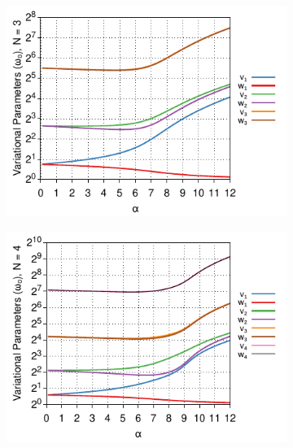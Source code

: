 \begin{figure}[!tbp]
\begin{subfigure}[b]{0.49\textwidth}
    \includegraphics[width=\textwidth]{figures/frohlich-3d-multivariate-vw-alpha-0to12-beta-inf-N-3-COLOUR.pdf}
  \end{subfigure}
  \begin{subfigure}[b]{0.49\textwidth}
    \centering
    \includegraphics[width=\textwidth]{figures/frohlich-3d-multivariate-vw-alpha-0to12-beta-inf-N-4-COLOUR.pdf}
  \end{subfigure}
  \begin{subfigure}[b]{0.49\textwidth}
    \centering

\end{subfigure}
\end{figure}
